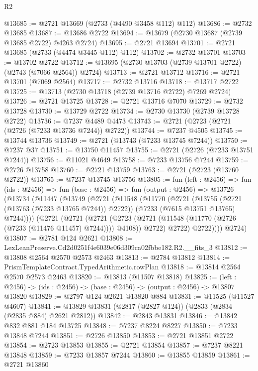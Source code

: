 \begin{lexlean}{R2}
\begin{coremodule}
@13685 := @2721 @13669 (@2733 (@4490 @3458 @112) @112)
@13686 := @2732 @13685
@13687 := @13686 @2722
@13694 := @13679 (@2730 @13687 (@2739 @13685 @2722) @4263 @2724)
@13695 := @2721 @13694
@13701 := @2721 @13685 (@2733 (@4474 @3445 @112) @112)
@13702 := @2732 @13701
@13703 := @13702 @2722
@13712 := @13695 (@2730 @13703 (@2739 @13701 @2722) (@2743 (@7066 @2564)) @2724)
@13713 := @2721 @13712
@13716 := @2721 @13701 (@7069 @2564)
@13717 := @2732 @13716
@13718 := @13717 @2722
@13725 := @13713 (@2730 @13718 (@2739 @13716 @2722) @7269 @2724)
@13726 := @2721 @13725
@13728 := @2721 @13716 @7070
@13729 := @2732 @13728
@13730 := @13729 @2722
@13734 := @2730 @13730 (@2739 @13728 @2722)
@13736 := @7237 @4489 @4473
@13743 := @2721 (@2723 (@2721 (@2726 (@7233 @13736 @7244)) @2722))
@13744 := @7237 @4505
@13745 := @13744 @13736
@13749 := @2721 (@13743 (@7233 @13745 @7244))
@13750 := @7237 @37
@13751 := @13750 @11457
@13755 := @2721 (@2726 (@7233 @13751 @7244))
@13756 := @11021 @4649
@13758 := @7233 @13756 @7244
@13759 := @2726 @13758
@13760 := @2721 @13759
@13763 := @2721 (@2723 (@13760 @2722))
@13765 := @7237 @13745 @13756
@13805 := fun (left : @2456) =>
  fun (ids : @2456) =>
  fun (base : @2456) =>
  fun (output : @2456) =>
  @13726
    (@13734
      (@11447
        (@13749
          (@2721
            (@11548
              (@11770
                (@2721
                  (@13755 (@2721 (@13763 (@7233 @13765 @7244)) @2722))
                  (@7233 (@7615 @13751 @13765) @7244))))
            (@2721
              (@2721
                (@2721
                  (@2723 (@2721 (@11548 (@11770 (@2726 (@7233 (@11476 @11457) @7244)))) @4108))
                  @2722)
                @2722)
              @2722))))
      @2724)
@13807 := @2781 @124 @2621
@13808 := LexLeanPreserve.Cd2d0251f4e6039e06d309ca02fbbe182.R2.__fits_3
@13812 := @13808 @2564 @2570 @2573 @2463
@13813 := @2784 @13812
@13814 := PrismTemplateContract.TypedArithmetic.rowPlan
@13818 := @13814 @2564 @2570 @2573 @2463
@13820 := @13813 (@11507 @13818)
@13825 := (left : @2456) -> (ids : @2456) -> (base : @2456) -> (output : @2456) -> @13807 @13820
@13829 := @2797 @124 @2621 @13820 @884
@13831 := @11525 (@11527 @4607)
@13841 := @13829 @13831 (@2817 (@2827 @124)) (@2833 (@2834 (@2835 @884) @2621 @2812))
@13842 := @2843 @13831
@13846 := @13842 @832 @881 @184 @13725
@13848 := @7237 @8224 @8227
@13850 := @7233 @13848 @7244
@13851 := @2726 @13850
@13853 := @2721 @13851 @2722
@13854 := @2723 @13853
@13855 := @2721 @13854
@13857 := @7237 @8221 @13848
@13859 := @7233 @13857 @7244
@13860 := @13855 @13859
@13861 := @2721 @13860

\end{coremodule}
\end{lexlean}
